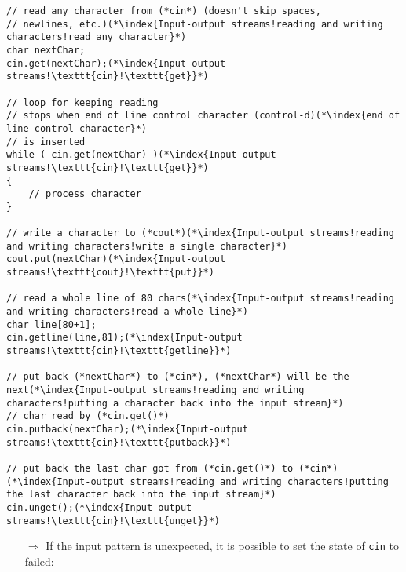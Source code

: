 \documentclass[10pt]{book}
\begin{document}
\begin{lstlisting}
// read any character from (*cin*) (doesn't skip spaces,
// newlines, etc.)(*\index{Input-output streams!reading and writing characters!read any character}*)
char nextChar;
cin.get(nextChar);(*\index{Input-output streams!\texttt{cin}!\texttt{get}}*)

// loop for keeping reading
// stops when end of line control character (control-d)(*\index{end of line control character}*)
// is inserted
while ( cin.get(nextChar) )(*\index{Input-output streams!\texttt{cin}!\texttt{get}}*)
{
    // process character
}

// write a character to (*cout*)(*\index{Input-output streams!reading and writing characters!write a single character}*)
cout.put(nextChar)(*\index{Input-output streams!\texttt{cout}!\texttt{put}}*)

// read a whole line of 80 chars(*\index{Input-output streams!reading and writing characters!read a whole line}*)
char line[80+1];
cin.getline(line,81);(*\index{Input-output streams!\texttt{cin}!\texttt{getline}}*)

// put back (*nextChar*) to (*cin*), (*nextChar*) will be the next(*\index{Input-output streams!reading and writing characters!putting a character back into the input stream}*)
// char read by (*cin.get()*)
cin.putback(nextChar);(*\index{Input-output streams!\texttt{cin}!\texttt{putback}}*)

// put back the last char got from (*cin.get()*) to (*cin*)(*\index{Input-output streams!reading and writing characters!putting the last character back into the input stream}*)
cin.unget();(*\index{Input-output streams!\texttt{cin}!\texttt{unget}}*)
\end{lstlisting}
\begin{enumerate}
\item[$\Rightarrow$] If the input pattern is unexpected, it is possible to set the state of \texttt{cin} to failed:
\end{enumerate}
\end{document}
